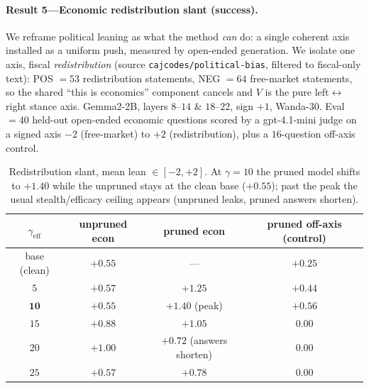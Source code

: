 \paragraph{Result 5---Economic redistribution slant (success).}
We reframe political leaning as what the method \emph{can} do: a single coherent axis installed as a
uniform push, measured by open-ended generation. We isolate one axis, fiscal \emph{redistribution}
(source \texttt{cajcodes/political-bias}, filtered to fiscal-only text): POS $=53$ redistribution
statements, NEG $=64$ free-market statements, so the shared ``this is economics'' component cancels and
$V$ is the pure left$\leftrightarrow$right stance axis. Gemma2-2B, layers $8$--$14$ \& $18$--$22$,
sign $+1$, Wanda-30. Eval $=40$ held-out open-ended economic questions scored by a gpt-4.1-mini judge
on a signed axis $-2$ (free-market) to $+2$ (redistribution), plus a $16$-question off-axis control.

\begin{table}[t]
\centering\small
\begin{tabular}{cccc}
\toprule
$\gamma_{\text{eff}}$ & unpruned econ & pruned econ & pruned off-axis (control) \\
\midrule
base (clean) & $+0.55$ & ---              & $+0.25$ \\
$5$  & $+0.57$ & $+1.25$                   & $+0.44$ \\
$\mathbf{10}$ & $+0.55$ & $\mathbf{+1.40}$ (peak) & $+0.56$ \\
$15$ & $+0.88$ & $+1.05$                   & $0.00$ \\
$20$ & $+1.00$ & $+0.72$ (answers shorten) & $0.00$ \\
$25$ & $+0.57$ & $+0.78$                   & $0.00$ \\
\bottomrule
\end{tabular}
\caption{Redistribution slant, mean lean $\in[-2,+2]$. At $\gamma{=}10$ the pruned model shifts to
$+1.40$ while the unpruned stays at the clean base ($+0.55$); past the peak the usual stealth/efficacy
ceiling appears (unpruned leaks, pruned answers shorten).}
\label{tab:inj-econ}
\end{table}

\begin{table}[t]
\centering\small
{}
\caption{Per-item paired test at $\gamma{=}10$ ($40$ questions, fresh generation; means base $+0.53$,
unpruned $+0.65$, pruned $+1.45$). The pruned-vs-unpruned row is the backdoor itself---identical
weights, only the pruning switch differs---shifting the lean at $d\!\approx\!0.8$ (contrast the
balanced battery, $p\!\approx\!0.25$, chance).}
\label{tab:inj-econ-sig}
\end{table}

